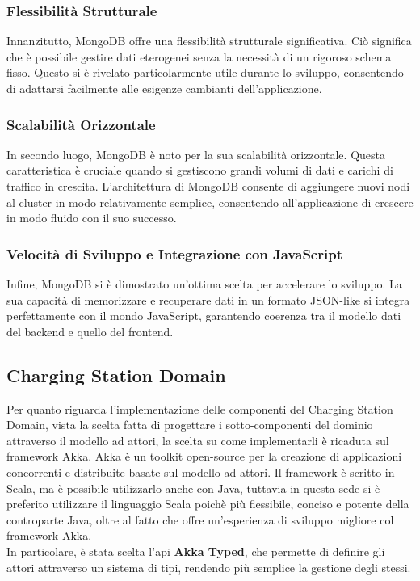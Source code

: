\subsubsection{Flessibilità Strutturale}

Innanzitutto, MongoDB offre una flessibilità strutturale significativa. Ciò significa che è possibile gestire dati eterogenei senza la necessità di un rigoroso schema fisso. Questo si è rivelato particolarmente utile durante lo sviluppo, consentendo di adattarsi facilmente alle esigenze cambianti dell'applicazione.

\subsubsection{Scalabilità Orizzontale}

In secondo luogo, MongoDB è noto per la sua scalabilità orizzontale. Questa caratteristica è cruciale quando si gestiscono grandi volumi di dati e carichi di traffico in crescita. L'architettura di MongoDB consente di aggiungere nuovi nodi al cluster in modo relativamente semplice, consentendo all'applicazione di crescere in modo fluido con il suo successo.

\subsubsection{Velocità di Sviluppo e Integrazione con JavaScript}

Infine, MongoDB si è dimostrato un'ottima scelta per accelerare lo sviluppo. La sua capacità di memorizzare e recuperare dati in un formato JSON-like si integra perfettamente con il mondo JavaScript, garantendo coerenza tra il modello dati del backend e quello del frontend.


\subsection{Charging Station Domain}
Per quanto riguarda l'implementazione delle componenti del Charging Station Domain, vista la scelta fatta di progettare i sotto-componenti del dominio attraverso il modello ad attori, la scelta su come implementarli è
ricaduta sul framework Akka. Akka è un toolkit open-source per la creazione di applicazioni concorrenti e distribuite basate sul modello ad attori. Il framework è scritto in Scala, ma è possibile utilizzarlo anche con Java, tuttavia in questa sede
si è preferito utilizzare il linguaggio Scala poichè più flessibile, conciso e potente della controparte Java, oltre al fatto che offre un'esperienza di sviluppo migliore col framework Akka.\\
In particolare, è stata scelta l'api \textbf{Akka Typed}, che permette di definire gli attori attraverso un sistema di tipi, rendendo più semplice la gestione degli stessi.\\

